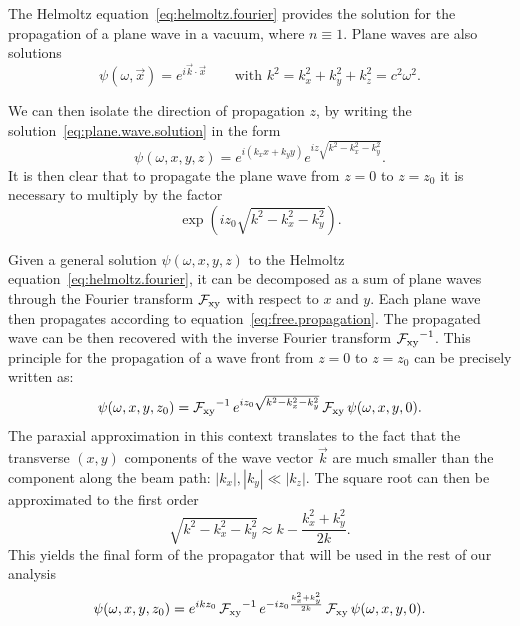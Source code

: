 The Helmoltz equation~\eqref{eq:helmoltz.fourier} provides the solution for
the propagation of a plane wave in a vacuum, where $n \equiv 1$. Plane waves
are also solutions
\begin{equation}
    \psi(\omega, \vec{x}) = e^{i\vec{k}\cdot \vec{x}} \qquad \text{with } k^2
    = k_x^2 + k_y^2 + k_z^2 = c^2 \omega^2.
    \label{eq:plane.wave.solution}
\end{equation}

We can then isolate the direction
of propagation $z$, by writing the solution~\eqref{eq:plane.wave.solution} in the form
\begin{equation}
    \psi(\omega, x, y, z) = e^{i(k_x x + k_y y)}e^{iz\sqrt{k^2 - k_x^2 -
    k_y^2}}.
    \label{eq:free.propagation}
\end{equation}
It is then clear that to propagate the plane wave from $z = 0$ to $z = z_0$
it is necessary to multiply by the factor
\begin{equation}
    \exp(iz_{0}\sqrt{k^2 - k_x^2 - k_y^2}).
    \label{eq:factor.propagator}
\end{equation}

Given a general solution $\psi(\omega, x, y, z)$ to the Helmoltz
equation~\eqref{eq:helmoltz.fourier}, it can be decomposed as a sum of plane
waves through the Fourier transform $\operatorname{\mathcal{F}_{xy}}$ with respect to $x$ and $y$. Each
plane wave then propagates according to
equation~\eqref{eq:free.propagation}. The propagated wave can be then
recovered with the inverse Fourier transform $\operatorname{\mathcal{F}_{xy}}^{-1}$.
This principle for the propagation of a wave front from $z=0$ to $z=z_0$ can
be precisely written as:
\begin{equation}
    \psi(\omega, x, y, z_0) = \operatorname{\mathcal{F}_{xy}}^{-1}e^{i z_0 \sqrt{k^2 - k_x^2 -
    k_y^2}}\operatorname{\mathcal{F}_{xy}}    \psi(\omega, x, y, 0).
    \label{eq:full.propagator}
\end{equation}
The paraxial approximation in this context translates to the fact that the
transverse $(x, y)$ components of the wave vector $\vec{k}$ are much smaller than the
component along the beam path: $|k_x|, |k_y| \ll |k_z|$. The square root can
then be approximated to the first order
\begin{equation}
    \sqrt{k^2 - k_x^2 - k_y^2} \approx k - \frac{k_x^2 + k_y^2}{2k}.
    \label{eq:square.root.approximation}
\end{equation}
This yields the final form of the propagator that will be used in the rest
of our analysis
\begin{equation}
    \psi(\omega, x, y, z_0) = e^{i k z_0}\operatorname{\mathcal{F}_{xy}}^{-1}e^{-i z_0\frac{k_x^2 +
    k_y^2}{2k}}\operatorname{\mathcal{F}_{xy}}\psi(\omega, x, y, 0). \label{eq:paraxial.propagator}
\end{equation}

